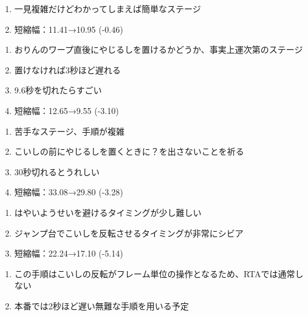 \begin{enumerate}[label={\sarrow}]
\item 一見複雑だけどわかってしまえば簡単なステージ
\item 短縮幅：11.41→10.95 (-0.46)
\end{enumerate}



\begin{enumerate}[label={\sarrow}]
\item おりんのワープ直後にやじるしを置けるかどうか、事実上運次第のステージ
\item 置けなければ3秒ほど遅れる
\item 9.6秒を切れたらすごい
\item 短縮幅：12.65→9.55 (-3.10)
\end{enumerate}



\begin{enumerate}[label={\sarrow}]
\item 苦手なステージ、手順が複雑
\item こいしの前にやじるしを置くときに？\hspace{0pt}を出さないことを祈る
\item 30秒切れるとうれしい
\item 短縮幅：33.08→29.80 (-3.28)
\end{enumerate}



\begin{enumerate}[label={\sarrow}]
\item はやいようせいを避けるタイミングが少し難しい
\item ジャンプ台でこいしを反転させるタイミングが非常にシビア
\item 短縮幅：22.24→17.10 (-5.14)
\end{enumerate}
\begin{marker}
\begin{enumerate}[label={\sarrow}]
\item この手順はこいしの反転がフレーム単位の操作となるため、RTAでは通常しない
\item 本番では2秒ほど遅い無難な手順を用いる予定
\end{enumerate}
\end{marker}



